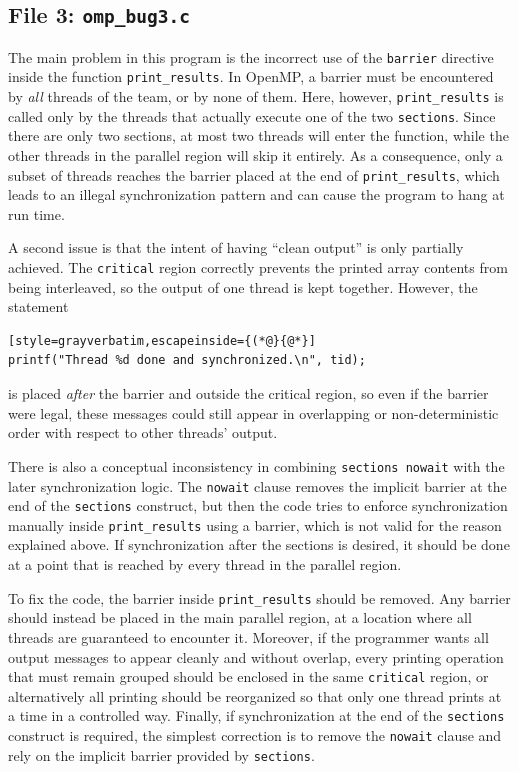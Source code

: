 \documentclass[unicode,10pt,a4paper,oneside,numbers=endperiod,openany]{scrartcl}
\begin{document}
\subsection{File 3: \texttt{omp\_bug3.c}}
The main problem in this program is the incorrect use of the \texttt{barrier} directive inside the function \texttt{print\_results}. In OpenMP, a barrier must be encountered by \emph{all} threads of the team, or by none of them. Here, however, \texttt{print\_results} is called only by the threads that actually execute one of the two \texttt{sections}. Since there are only two sections, at most two threads will enter the function, while the other threads in the parallel region will skip it entirely. As a consequence, only a subset of threads reaches the barrier placed at the end of \texttt{print\_results}, which leads to an illegal synchronization pattern and can cause the program to hang at run time.

A second issue is that the intent of having ``clean output'' is only partially achieved. The \texttt{critical} region correctly prevents the printed array contents from being interleaved, so the output of one thread is kept together. However, the statement
\begin{lstlisting}[style=grayverbatim,escapeinside={(*@}{@*}]
printf("Thread %d done and synchronized.\n", tid);
\end{lstlisting}
is placed \emph{after} the barrier and outside the critical region, so even if the barrier were legal, these messages could still appear in overlapping or non-deterministic order with respect to other threads' output.

There is also a conceptual inconsistency in combining \texttt{sections nowait} with the later synchronization logic. The \texttt{nowait} clause removes the implicit barrier at the end of the \texttt{sections} construct, but then the code tries to enforce synchronization manually inside \texttt{print\_results} using a barrier, which is not valid for the reason explained above. If synchronization after the sections is desired, it should be done at a point that is reached by every thread in the parallel region.

To fix the code, the barrier inside \texttt{print\_results} should be removed. Any barrier should instead be placed in the main parallel region, at a location where all threads are guaranteed to encounter it. Moreover, if the programmer wants all output messages to appear cleanly and without overlap, every printing operation that must remain grouped should be enclosed in the same \texttt{critical} region, or alternatively all printing should be reorganized so that only one thread prints at a time in a controlled way. Finally, if synchronization at the end of the \texttt{sections} construct is required, the simplest correction is to remove the \texttt{nowait} clause and rely on the implicit barrier provided by \texttt{sections}.
\end{document}
